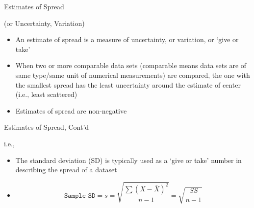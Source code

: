 \documentclass[14pt]{beamer}\usepackage[]{graphicx}\usepackage[]{color}
\begin{document}
\begin{frame}[fragile]{Estimates of Spread }

(or Uncertainty, Variation)

\begin{itemize}
\item<1-> An estimate of spread is a measure of uncertainty, or  variation, or `give or take'
\item<2-> When two or more comparable data sets (comparable means data sets are of same type/same unit of numerical  measurements) are compared, the one with the smallest spread has the least uncertainty around the estimate of center (i.e., least  scattered)
\item<3-> Estimates of spread are non-negative
\end{itemize}
\end{frame}

\begin{frame}[fragile]{Estimates of Spread, Cont'd}

 i.e., 
 
\begin{itemize} 
\item<1-> The standard deviation (SD) is typically used as a `give or  take' number in describing the spread of a dataset 
\item<2->
\begin{equation*}
\texttt{Sample SD} = s = \sqrt{ \frac{ \sum (X - \bar{X})^2}{n - 1}} = \sqrt{ \frac{SS}{n -1}}
\end{equation*}
\end{itemize}
\end{frame}
\end{document}
